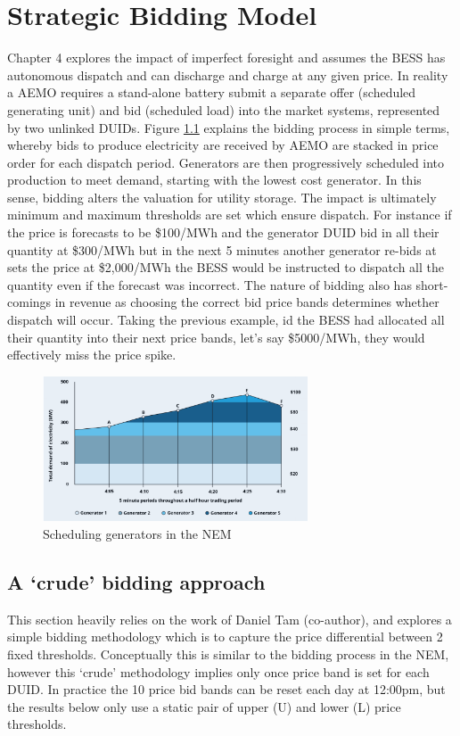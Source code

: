 \chapter{Strategic Bidding Model}
Chapter 4 explores the impact of imperfect foresight and assumes the BESS has autonomous dispatch and can discharge and charge at any given price. In reality a AEMO requires a stand-alone battery submit a separate offer (scheduled generating unit) and bid (scheduled load) into the market systems, represented by two unlinked DUIDs.
Figure \ref{fig:bidding_nem} explains the bidding process in simple terms, whereby bids to produce electricity are received by AEMO are stacked in price order for each dispatch period. Generators are then progressively scheduled into production to meet demand, starting with the lowest cost generator. In this sense, bidding alters the valuation for utility storage. The impact is ultimately minimum and maximum thresholds are set which ensure dispatch. For instance if the price is forecasts to be \$100/MWh and the generator DUID bid in all their quantity at \$300/MWh but in the next 5 minutes another generator re-bids at sets the price at \$2,000/MWh the BESS would be instructed to dispatch all the quantity even if the forecast was incorrect. The nature of bidding also has short-comings in revenue as choosing the correct bid price bands determines whether dispatch will occur. Taking the previous example, id the BESS had allocated all their quantity into their next price bands, let's say \$5000/MWh, they would effectively miss the price spike.
\begin{figure}[H]
    \centering
    \includegraphics[width=0.7\textwidth]{Pictures/Chapter5/bidding.png}
    \caption{Scheduling generators in the NEM \parencite{AEMC_Bidding}}
    \label{fig:bidding_nem}
\end{figure}
\section{ A `crude' bidding approach}
\label{sec:crude}
This section heavily relies on the work of Daniel Tam (co-author), and explores a simple bidding methodology which is to capture the price differential between 2 fixed thresholds. Conceptually this is similar to the bidding process in the NEM, however this `crude' methodology implies only once price band is set for each DUID. In practice the 10 price bid bands can be reset each day at 12:00pm, but the results below only use a static pair of upper (U) and lower (L) price thresholds.
